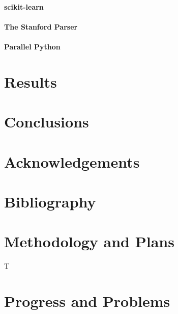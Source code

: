 \documentclass{article}
\begin{document}
\paragraph{scikit-learn}
\paragraph{The Stanford Parser}
\paragraph{Parallel Python}

\section{Results}



\section{Conclusions}


\section{Acknowledgements}

\section{Bibliography}



\section{Methodology and Plans}
T
\section{Progress and Problems}
\end{document}
